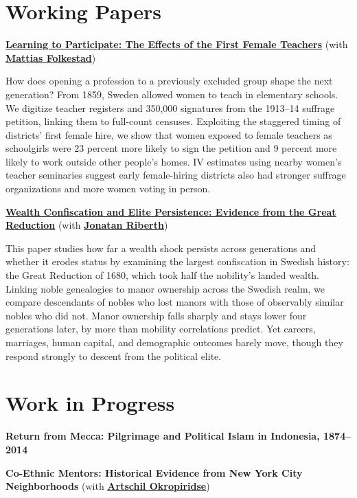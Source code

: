 \documentclass[a4paper]{article}
\newcommand{\paperentry}[3]{%
  \noindent\textbf{#1} #2\par
  \vspace{2pt}
  {#3\par}
}
\newcommand{\paperentryshort}[2]{%
  \noindent\textbf{#1} #2\par
}
\newcommand{\paperentrynoabstract}[1]{%
  \noindent\textbf{#1}\par
}
\begin{document}
\section*{Working Papers}

\paperentry
{\href{https://www.monirbounadi.com/assets/wps/female_teachers.pdf}{Learning to Participate: The Effects of the First Female Teachers}}
{(with \href{https://mattiasfolkestad.com/}{\textbf{Mattias Folkestad}})}
{How does opening a profession to a previously excluded group shape the next generation? From 1859, Sweden allowed women to teach in elementary schools. We digitize teacher registers and 350,000 signatures from the 1913--14 suffrage petition, linking them to full-count censuses. Exploiting the staggered timing of districts’ first female hire, we show that women exposed to female teachers as schoolgirls were 23 percent more likely to sign the petition and 9 percent more likely to work outside other people’s homes. IV estimates using nearby women’s teacher seminaries suggest early female-hiring districts also had stronger suffrage organizations and more women voting in person.}

\newpage

\paperentry
{\href{https://www.monirbounadi.com/assets/wps/great_reduction.pdf}{Wealth Confiscation and Elite Persistence: Evidence from the Great Reduction}}
{(with \href{https://www.jonatanriberth.com/}{\textbf{Jonatan \mbox{Riberth}}})}
{This paper studies how far a wealth shock persists across generations and whether it erodes status by examining the largest confiscation in Swedish history: the Great Reduction of 1680, which took half the nobility’s landed wealth. Linking noble genealogies to manor ownership across the Swedish realm, we compare descendants of nobles who lost manors with those of observably similar nobles who did not. Manor ownership falls sharply and stays lower four generations later, by more than mobility correlations predict. Yet careers, marriages, human capital, and demographic outcomes barely move, though they respond strongly to descent from the political elite.}

\section*{Work in Progress}

\paperentrynoabstract
{Return from Mecca: Pilgrimage and Political Islam in Indonesia, 1874--2014}
\smallskip

{\fontsize{9.65}{12}\selectfont
\paperentryshort
{Co-Ethnic Mentors: Historical Evidence from New York City Neighborhoods}
{(with \href{https://www.su.se/english/profiles/a/arok7783}{\textbf{Artschil Okropiridse}})}
}
\end{document}
